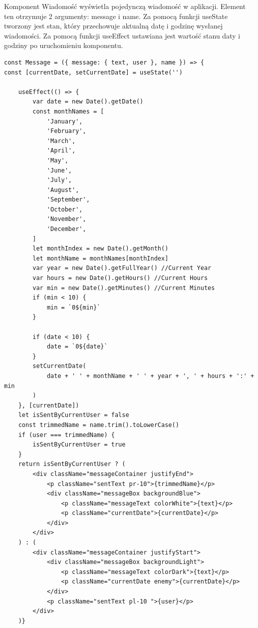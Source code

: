 Komponent Wiadomość wyświetla pojedynczą wiadomość w aplikacji. Element ten otrzymuje 2 argumenty: message i name. Za pomocą funkcji useState tworzony jest stan, który przechowuje aktualną datę i godzinę wysłanej wiadomości. Za pomocą funkcji useEffect ustawiana jest wartość stanu daty i godziny po uruchomieniu komponentu. 
\begin{lstlisting}[caption=Implementacja komponentu z pojedyncza wiadomoscia ]
const Message = ({ message: { text, user }, name }) => {
const [currentDate, setCurrentDate] = useState('')

    useEffect(() => {
        var date = new Date().getDate() 
        const monthNames = [
            'January',
            'February',
            'March',
            'April',
            'May',
            'June',
            'July',
            'August',
            'September',
            'October',
            'November',
            'December',
        ]
        let monthIndex = new Date().getMonth()
        let monthName = monthNames[monthIndex]
        var year = new Date().getFullYear() //Current Year
        var hours = new Date().getHours() //Current Hours
        var min = new Date().getMinutes() //Current Minutes
        if (min < 10) {
            min = `0${min}`
        }

        if (date < 10) {
            date = `0${date}`
        }
        setCurrentDate(
            date + ' ' + monthName + ' ' + year + ', ' + hours + ':' + min
        )
    }, [currentDate])
    let isSentByCurrentUser = false
    const trimmedName = name.trim().toLowerCase()
    if (user === trimmedName) {
        isSentByCurrentUser = true
    }
    return isSentByCurrentUser ? (
        <div className="messageContainer justifyEnd">
            <p className="sentText pr-10">{trimmedName}</p>
            <div className="messageBox backgroundBlue">
                <p className="messageText colorWhite">{text}</p>
                <p className="currentDate">{currentDate}</p>
            </div>
        </div>
    ) : (
        <div className="messageContainer justifyStart">
            <div className="messageBox backgroundLight">
                <p className="messageText colorDark">{text}</p>
                <p className="currentDate enemy">{currentDate}</p>
            </div>
            <p className="sentText pl-10 ">{user}</p>
        </div>
    )}
\end{lstlisting}

